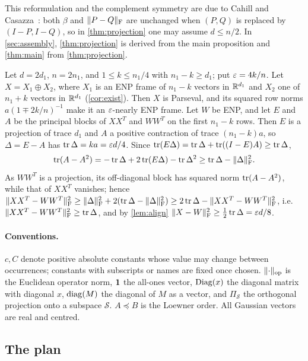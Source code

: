 This reformulation and the complement symmetry are due to Cahill and
Casazza~\cite{CC}: both $\beta$ and $\lVert P-Q\rVert_{\mathrm F}$ are unchanged when $(P,Q)$ is
replaced by $(I-P,I-Q)$, so in \cref{thm:projection} one may assume $d\le n/2$.
In \cref{sec:assembly}, \cref{thm:projection} is derived from the main proposition
and \cref{thm:main} from \cref{thm:projection}.

\begin{remark}[Optimality]\label{rem:optimal}
Let $d=2d_1$, $n=2n_1$, and $1\le k\le n_1/4$ with $n_1-k\ge d_1$; put
$\varepsilon=4k/n$. Let $X=X_1\oplus X_2$, where $X_1$ is an ENP frame of $n_1-k$
vectors in $\mathbb R^{d_1}$ and $X_2$ one of $n_1+k$ vectors in $\mathbb R^{d_1}$
(\cref{cor:exist}). Then $X$ is Parseval, and its squared row norms
$a(1\mp2k/n)^{-1}$ make it an $\varepsilon$-nearly ENP frame. Let $W$ be ENP, and let $E$
and $A$ be the principal blocks of $XX^T$ and $WW^T$ on the first $n_1-k$ rows.
Then $E$ is a projection of trace $d_1$ and $A$ a positive contraction of trace
$(n_1-k)a$, so $\Delta=E-A$ has $\operatorname{tr}\Delta=ka=\varepsilon d/4$. Since
$\operatorname{tr}(E\Delta)=\operatorname{tr}\Delta+\operatorname{tr}((I-E)A)\ge\operatorname{tr}\Delta$,
\[
 \operatorname{tr}(A-A^2)=-\operatorname{tr}\Delta+2\operatorname{tr}(E\Delta)-\operatorname{tr}\Delta^2\ge\operatorname{tr}\Delta-\lVert \Delta\rVert_{\mathrm F}^2 .
\]
As $WW^T$ is a projection, its off-diagonal block has squared norm $\operatorname{tr}(A-A^2)$,
while that of $XX^T$ vanishes; hence
$\lVert XX^T-WW^T\rVert_{\mathrm F}^2\ge\lVert \Delta\rVert_{\mathrm F}^2+2(\operatorname{tr}\Delta-\lVert \Delta\rVert_{\mathrm F}^2)\ge2\operatorname{tr}\Delta-\lVert XX^T-WW^T\rVert_{\mathrm F}^2$,
i.e.\ $\lVert XX^T-WW^T\rVert_{\mathrm F}^2\ge\operatorname{tr}\Delta$, and by \cref{lem:align}
$\lVert X-W\rVert_{\mathrm F}^2\ge\frac12\operatorname{tr}\Delta=\varepsilon d/8$.
\end{remark}

\paragraph{Conventions.} $c,C$ denote positive absolute constants whose value
may change between occurrences; constants with subscripts or names are fixed
once chosen. $\lVert \cdot\rVert_{\mathrm{op}}$ is the Euclidean operator norm, $\mathbf 1$ the all-ones
vector, $\operatorname{Diag}(x)$ the diagonal matrix with diagonal $x$, $\operatorname{diag}(M)$ the diagonal
of $M$ as a vector, and $\Pi_{\mathcal S}$ the orthogonal projection onto a
subspace $\mathcal S$. $A\preceq B$ is the Loewner order. All Gaussian vectors are
real and centred.

\subsection{The plan}\label{subsec:plan}

